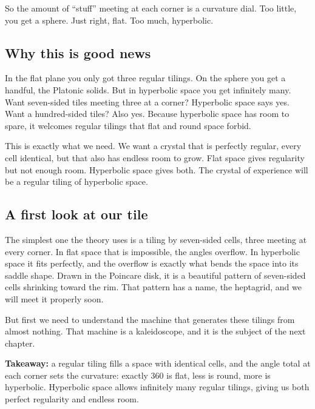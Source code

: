 So the amount of ``stuff'' meeting at each corner is a curvature dial. Too little, you get a sphere. Just right, flat. Too much, hyperbolic.

\subsection{Why this is good news}

In the flat plane you only got three regular tilings. On the sphere you get a handful, the Platonic solids. But in hyperbolic space you get infinitely many. Want seven-sided tiles meeting three at a corner? Hyperbolic space says yes. Want a hundred-sided tiles? Also yes. Because hyperbolic space has room to spare, it welcomes regular tilings that flat and round space forbid.

This is exactly what we need. We want a crystal that is perfectly regular, every cell identical, but that also has endless room to grow. Flat space gives regularity but not enough room. Hyperbolic space gives both. The crystal of experience will be a regular tiling of hyperbolic space.

\subsection{A first look at our tile}

The simplest one the theory uses is a tiling by seven-sided cells, three meeting at every corner. In flat space that is impossible, the angles overflow. In hyperbolic space it fits perfectly, and the overflow is exactly what bends the space into its saddle shape. Drawn in the Poincare disk, it is a beautiful pattern of seven-sided cells shrinking toward the rim. That pattern has a name, the heptagrid, and we will meet it properly soon.

But first we need to understand the machine that generates these tilings from almost nothing. That machine is a kaleidoscope, and it is the subject of the next chapter.

\textbf{Takeaway:} a regular tiling fills a space with identical cells, and the angle total at each corner sets the curvature: exactly 360 is flat, less is round, more is hyperbolic. Hyperbolic space allows infinitely many regular tilings, giving us both perfect regularity and endless room.
